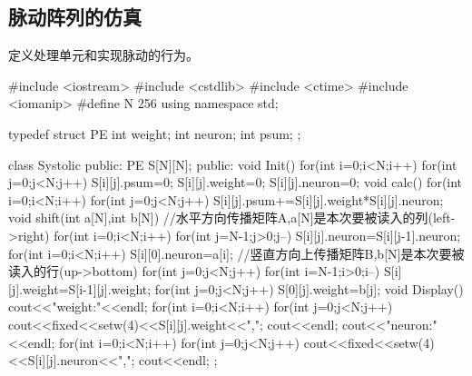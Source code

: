 \subsection{脉动阵列的仿真}
定义处理单元和实现脉动的行为。
\begin{codeblock}[language=C]
#include <iostream>
#include <cstdlib>
#include <ctime>
#include <iomanip>
#define N 256
using namespace std;

typedef struct PE{
    int weight;
    int neuron;
    int psum;
};

class Systolic{
public:
    PE S[N][N];
public:
    void Init(){
        for(int i=0;i<N;i++)
            for(int j=0;j<N;j++){
                S[i][j].psum=0;
                S[i][j].weight=0;
                S[i][j].neuron=0;
            }
    }
    void calc(){
        for(int i=0;i<N;i++)
            for(int j=0;j<N;j++)
                S[i][j].psum+=S[i][j].weight*S[i][j].neuron;
    }
    void shift(int a[N],int b[N]){
        //水平方向传播矩阵A,a[N]是本次要被读入的列(left->right)
        for(int i=0;i<N;i++)
            for(int j=N-1;j>0;j--){
                S[i][j].neuron=S[i][j-1].neuron;
        }
        for(int i=0;i<N;i++)
            S[i][0].neuron=a[i];
        //竖直方向上传播矩阵B,b[N]是本次要被读入的行(up->bottom)
        for(int j=0;j<N;j++)
            for(int i=N-1;i>0;i--){
                S[i][j].weight=S[i-1][j].weight;
        }
        for(int j=0;j<N;j++)
            S[0][j].weight=b[j];
    }
    void Display(){
        cout<<"weight:"<<endl;
        for(int i=0;i<N;i++){
            for(int j=0;j<N;j++)
                cout<<fixed<<setw(4)<<S[i][j].weight<<",";
            cout<<endl;
        }
        cout<<"neuron:"<<endl;
        for(int i=0;i<N;i++){
            for(int j=0;j<N;j++)
                cout<<fixed<<setw(4)<<S[i][j].neuron<<",";
            cout<<endl;
        }
    }
};

\end{codeblock}



